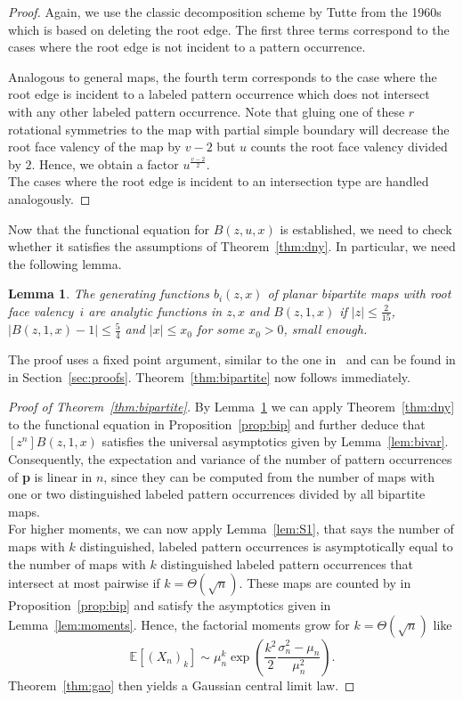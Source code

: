 \documentclass[reqno, 11pt]{amsart}
\newtheorem{lemma}{Lemma}
\theoremstyle{definition}
\theoremstyle{remark}
\newcommand{\E}{\mathbb{E}}
\newcommand{\map}[1]{\textbf{#1}}
\numberwithin{equation}{section}
\begin{document}
\begin{proof}
    Again, we use the classic decomposition scheme by Tutte from the 1960s \cite{tutte_1963} which is based on deleting the root edge. The first three terms correspond to the cases where the root edge is not incident to a pattern occurrence.  

    Analogous to general maps, the fourth term corresponds to the case where the root edge is incident to a labeled pattern occurrence which does not intersect with any other labeled pattern occurrence. Note that gluing one of these $r$ rotational symmetries to the map with partial simple boundary will decrease the root face valency of the map by $v-2$ but $u$ counts the root face valency divided by $2$. Hence, we obtain a factor $u^{\frac{v-2}{2}}$.\\
    The cases where the root edge is incident to an intersection type are handled analogously.
\end{proof}

Now that the functional equation for $B(z,u,x)$ is established, we need to check whether it satisfies the assumptions of Theorem~\ref{thm:dny}. In particular, we need the following lemma. 

\begin{lemma}\label{lem:mov_bip}
	The generating functions $b_i(z,x)$ of planar bipartite maps with root face valency~$i$ are analytic functions in $z,x$ and $B(z,1,x)$ if $|z|\leq \frac{2}{15}$, $|B(z,1,x)-1| \leq \frac{5}{4}$ and $|x| \leq x_0$ for some $x_0>0$, small enough.
\end{lemma}

The proof uses a fixed point argument, similar to the one in~\cite{DrPa} and can be found in in Section~\ref{sec:proofs}. Theorem~\ref{thm:bipartite} now follows immediately.

\begin{proof}[Proof of Theorem~\ref{thm:bipartite}]
    By Lemma~\ref{lem:mov_bip} we can apply Theorem~\ref{thm:dny} to the functional equation in Proposition~\ref{prop:bip} and further deduce that $[z^n]B(z,1,x)$ satisfies the universal asymptotics given by Lemma~\ref{lem:bivar}. Consequently,
    the expectation and variance of the number of pattern occurrences of \map{p} is linear in $n$, since they can be computed from the number of maps with one or two distinguished labeled pattern occurrences divided by all bipartite maps. \\
    For higher moments, we can now apply Lemma~\ref{lem:S1}, that says the number of maps with $k$ distinguished, labeled pattern occurrences is asymptotically equal to the number of maps with $k$ distinguished labeled pattern occurrences that intersect at most pairwise if $k = \Theta(\sqrt{n})$. These maps are counted by in Proposition~\ref{prop:bip} and satisfy the asymptotics given in Lemma~\ref{lem:moments}. Hence, the factorial moments grow for $k=\Theta(\sqrt{n})$ like
    \[
        \E[(X_n)_k] \sim \mu_n^k\exp\left(\frac{k^2}{2}\frac{\sigma_n^2-\mu_n}{\mu_n^2}\right).
    \]
    Theorem~\ref{thm:gao} then yields a Gaussian central limit law.
\end{proof}
\end{document}

